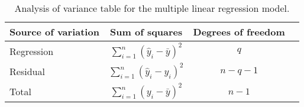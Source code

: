 
\begin{center}
\begin{longtable}{lccc}
\caption{Analysis of variance table for the multiple linear regression model.
\label{MLR-ANOVA-tab}} \\
Source of variation & Sum of squares & Degrees of freedom  \\ \hline
Regression & $\sum\limits_{i = 1}^n (\hat{y}_i - \bar{y})^2$ & $q$ \\
Residual & $\sum\limits_{i = 1}^n (\hat{y}_i - y_i)^2$ & $n - q - 1$ \\
Total & $\sum\limits_{i = 1}^n (y_i - \bar{y})^2$ & $n - 1$ \\
\end{longtable}
\end{center}
